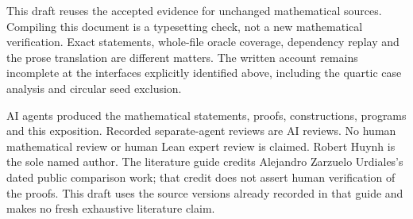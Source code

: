 \documentclass[11pt]{article}
\begin{document}
This draft reuses the accepted evidence for unchanged mathematical sources. Compiling this document is a typesetting check, not a new mathematical verification. Exact statements, whole-file oracle coverage, dependency replay and the prose translation are different matters. The written account remains incomplete at the interfaces explicitly identified above, including the quartic case analysis and circular seed exclusion.

AI agents produced the mathematical statements, proofs, constructions, programs and this exposition. Recorded separate-agent reviews are AI reviews. No human mathematical review or human Lean expert review is claimed. Robert Huynh is the sole named author. The literature guide credits Alejandro Zarzuelo Urdiales's dated public comparison work; that credit does not assert human verification of the proofs. This draft uses the source versions already recorded in that guide and makes no fresh exhaustive literature claim.

\appendix
\end{document}
